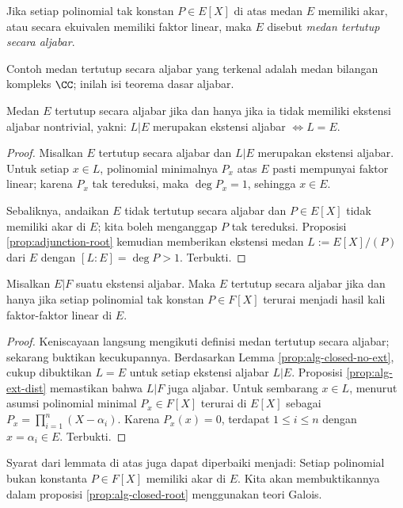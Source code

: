 \begin{definition}
	Jika setiap polinomial tak konstan $P \in E[X]$ di atas medan $E$ memiliki akar, atau secara ekuivalen memiliki faktor linear, maka $E$ disebut \emph{medan tertutup secara aljabar}.
\end{definition}
Contoh medan tertutup secara aljabar yang terkenal adalah medan bilangan kompleks $\CC$; inilah isi teorema dasar aljabar.

\begin{lemma}\label{prop:alg-closed-no-ext}
	Medan $E$ tertutup secara aljabar jika dan hanya jika ia tidak memiliki ekstensi aljabar nontrivial, yakni: $L|E$ merupakan ekstensi aljabar $\iff L=E$.
\end{lemma}
\begin{proof}
	Misalkan $E$ tertutup secara aljabar dan $L|E$ merupakan ekstensi aljabar. Untuk setiap $x \in L$, polinomial minimalnya $P_x$ atas $E$ pasti mempunyai faktor linear; karena $P_x$ tak tereduksi, maka $\deg P_x = 1$, sehingga $x \in E$.
	
	Sebaliknya, andaikan $E$ tidak tertutup secara aljabar dan $P \in E[X]$ tidak memiliki akar di $E$; kita boleh menganggap $P$ tak tereduksi. Proposisi \ref{prop:adjunction-root} kemudian memberikan ekstensi medan $L := E[X]/(P)$ dari $E$ dengan $[L:E] = \deg P > 1$. Terbukti.
\end{proof}

\begin{lemma}\label{prop:alg-closed-decomp}
	Misalkan $E|F$ suatu ekstensi aljabar. Maka $E$ tertutup secara aljabar jika dan hanya jika setiap polinomial tak konstan $P \in F[X]$ terurai menjadi hasil kali faktor-faktor linear di $E$.
\end{lemma}
\begin{proof}
	Keniscayaan langsung mengikuti definisi medan tertutup secara aljabar; sekarang buktikan kecukupannya. Berdasarkan Lemma \ref{prop:alg-closed-no-ext}, cukup dibuktikan $L=E$ untuk setiap ekstensi aljabar $L|E$. Proposisi \ref{prop:alg-ext-dist} memastikan bahwa $L|F$ juga aljabar. Untuk sembarang $x \in L$, menurut asumsi polinomial minimal $P_x \in F[X]$ terurai di $E[X]$ sebagai $P_x = \prod_{i=1}^n (X - \alpha_i)$. Karena $P_x(x)=0$, terdapat $1 \leq i \leq n$ dengan $x = \alpha_i \in E$. Terbukti.
\end{proof}
Syarat dari lemmata di atas juga dapat diperbaiki menjadi: Setiap polinomial bukan konstanta $P \in F[X]$ memiliki akar di $E$. Kita akan membuktikannya dalam proposisi \ref{prop:alg-closed-root} menggunakan teori Galois.

